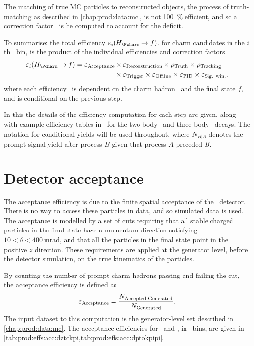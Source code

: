 The matching of true \ac{MC} particles to reconstructed objects, the process of 
truth-matching as described in \cref{chap:prod:data:mc}, is not \SI{100}{\%} 
efficient, and so a correction factor \efftruth\ is be computed to account for 
the deficit.

To summarise: the total efficiency $\eff_{i}(\decay{\PHc}{f})$, for charm 
candidates in the $i$th \pTy\ bin, is the product of the individual 
efficiencies and correction factors
\begin{align}
  \eff_{i}(\decay{\PHc}{f}) = \effacc &\times \effreco \times \efftruth \times \efftracking \nonumber\\
                                      &\times \efftrig \times \effoffline \times \effpid \times \effsigwin.
  \label{eqn:prod:effs:total_eff}
\end{align}
where each efficiency \eff\ is dependent on the charm hadron \PHc\ and the 
final state $f$, and is conditional on the previous step.

In this  the details of the efficiency computation 
for each step are given, along with example efficiency tables in \pTy\ for the 
two-body \DzToKpi\ and three-body \DpToKpipi\ decays.
The notation for conditional yields will be used throughout, where $N_{B|A}$ 
denotes the prompt signal yield after process $B$ given that process $A$ 
preceded $B$.

\section{Detector acceptance}
\label{chap:prod:effs:acc}

The acceptance efficiency is due to the finite spatial acceptance of the \lhcb\ 
detector.
There is no way to access these particles in data, and so simulated data is 
used.
The acceptance is modelled by a set of cuts requiring that all stable charged 
particles in the final state have a momentum direction satisfying $10 < \theta 
< \SI{400}{\milli\radian}$, and that all the particles in the final state point 
in the positive $z$ direction.
These requirements are applied at the generator level, before the detector 
simulation, on the true kinematics of the particles.

By counting the number of prompt charm hadrons passing and failing the cut, the 
acceptance efficiency is defined as
\begin{equation}
  \effacc = \frac{%
    N_{\text{Accepted}|\text{Generated}}
  }
  {%
    N_{\text{\text{Generated}}}
  }.
  \label{eqn:prod:effs:acc}
\end{equation}
The input dataset to this computation is the generator-level set described in 
\cref{chap:prod:data:mc}.
The acceptance efficiencies for \DzToKpi\ and \DpToKpipi, in \pTy\ bins, are 
given in \cref{tab:prod:effs:acc:dztokpi,tab:prod:effs:acc:dptokpipi}.

